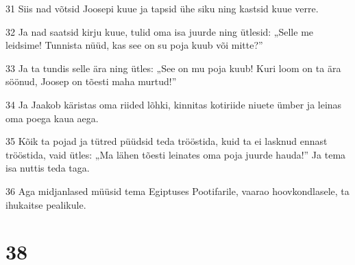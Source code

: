\par 31 Siis nad võtsid Joosepi kuue ja tapsid ühe siku ning kastsid kuue verre.
\par 32 Ja nad saatsid kirju kuue, tulid oma isa juurde ning ütlesid: „Selle me leidsime! Tunnista nüüd, kas see on su poja kuub või mitte?”
\par 33 Ja ta tundis selle ära ning ütles: „See on mu poja kuub! Kuri loom on ta ära söönud, Joosep on tõesti maha murtud!”
\par 34 Ja Jaakob käristas oma riided lõhki, kinnitas kotiriide niuete ümber ja leinas oma poega kaua aega.
\par 35 Kõik ta pojad ja tütred püüdsid teda trööstida, kuid ta ei lasknud ennast trööstida, vaid ütles: „Ma lähen tõesti leinates oma poja juurde hauda!” Ja tema isa nuttis teda taga.
\par 36 Aga midjanlased müüsid tema Egiptuses Pootifarile, vaarao hoovkondlasele, ta ihukaitse pealikule.

\chapter{38}

